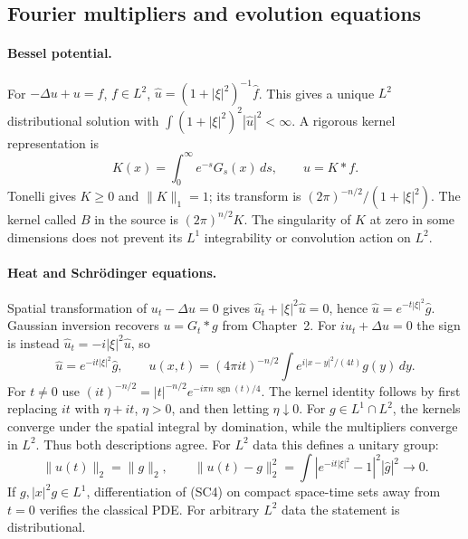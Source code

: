 \Needspace{35mm}
\subsection{Fourier multipliers and evolution equations}
\paragraph{Bessel potential.}
For $-\Delta u+u=f$, $f\in L^2$,
$\widehat u=(1+|\xi|^2)^{-1}\widehat f$.
This gives a unique $L^2$ distributional solution with
$\int(1+|\xi|^2)^2|\widehat u|^2<\infty$.
A rigorous kernel representation is
\[
 K(x)=\int_0^\infty e^{-s}G_s(x)\,ds,\qquad u=K*f .
\]
Tonelli gives $K\geq0$ and $\|K\|_1=1$;
its transform is $(2\pi)^{-n/2}/(1+|\xi|^2)$.
The kernel called $B$ in the source is $(2\pi)^{n/2}K$.
The singularity of $K$ at zero in some dimensions does not prevent
its $L^1$ integrability or convolution action on $L^2$.
\Needspace{45mm}

\paragraph{Heat and Schr\"odinger equations.}
Spatial transformation of $u_t-\Delta u=0$ gives
$\widehat u_t+|\xi|^2\widehat u=0$, hence
$\widehat u=e^{-t|\xi|^2}\widehat g$.
Gaussian inversion recovers $u=G_t*g$ from Chapter~2.
For $iu_t+\Delta u=0$ the sign is instead
$\widehat u_t=-i|\xi|^2\widehat u$, so
\[
 \widehat u=e^{-it|\xi|^2}\widehat g,\qquad
 u(x,t)=(4\pi it)^{-n/2}\int e^{i|x-y|^2/(4t)}g(y)\,dy .
 \tag{SC4}
\]
For $t\ne0$ use
$(it)^{-n/2}=|t|^{-n/2}e^{-i\pi n\,\operatorname{sgn}(t)/4}$.
The kernel identity follows by first replacing $it$ with $\eta+it$,
$\eta>0$, and then letting $\eta\downarrow0$.
For $g\in L^1\cap L^2$, the kernels converge under the spatial integral
by domination, while the multipliers converge in $L^2$.
Thus both descriptions agree.
For $L^2$ data this defines a unitary group:
\[
 \|u(t)\|_2=\|g\|_2,\qquad
 \|u(t)-g\|_2^2
 =\int|e^{-it|\xi|^2}-1|^2|\widehat g|^2\longrightarrow0 .
\]
If $g,|x|^2g\in L^1$, differentiation of (SC4) on compact
space-time sets away from $t=0$ verifies the classical PDE.
For arbitrary $L^2$ data the statement is distributional.
\Needspace{45mm}

